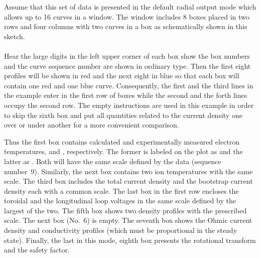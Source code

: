 
\noindent
Assume that this set of data is presented in the default radial output
mode which allows up to 16 curves in a window. 
The window includes 8 boxes placed in two rows and four columns with
two curves in a box as schematically shown in this sketch.
\bigskip\\
\smallskip\\
Hear the large digits in the left upper corner of each box show the box
numbers and the curve sequence number are shown in ordinary type.
Then the first eight profiles will be shown in red and the next eight in
blue so that each box will contain one red and one blue curve.
Consequently, the first and the third lines in the example enter in the
first row of boxes while the second and the forth lines occupy the second
row. 
The empty instructions \twd{\bs;} are used in this example in order to
skip the sixth box and put all quantities related to the current density
one over or under another for a more convenient comparison.

Thus the first box contains calculated and experimentally
measured electron temperatures,  and , respectively. 
The former is labeled on the plot as  and the latter as 
. 
Both will have the same scale defined by the data  (sequence
number~9).
Similarly, the next box contains two ion temperatures with the same
scale. 
The third box includes the total current density  and the
bootstrap current density  each with a common scale.
The last box in the first row encloses the toroidal  and the
longitudinal  loop voltages in the same scale defined by the
largest of the two.
The fifth box shows two density profiles with the
prescribed scale. 
The next box (No.~6) is empty. 
The seventh box shows the Ohmic current density and conductivity
profiles (which must be proportional in the steady state).
Finally, the last in this mode, eighth box presents the rotational
transform  and the safety factor.

